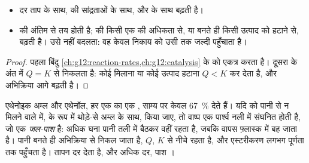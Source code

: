 \begin{proposition}[दर और लब्धि के उत्तोलक]\label{prop:g12:synthesis-strategy:levers}
\begin{itemize}
  \item दर ताप के साथ,  की सांद्रताओं के साथ,
        और  के साथ बढ़ती है।
  \item {} की अंतिम   से
        तय होती है;  की  किसी एक  की
        अधिकता से, या बनते ही किसी उत्पाद को हटाने से, बढ़ती है।
         उसे नहीं बदलता: वह केवल निकाय को उसी  तक
        जल्दी पहुँचाता है।
\end{itemize}
\end{proposition}

\begin{proof}
पहला बिंदु \cref{ch:g12:reaction-rates,ch:g12:catalysis} के 
को एकत्र करता है। दूसरा  के अंत में
$Q = K$ से निकलता है: कोई  मिलाना या कोई उत्पाद हटाना
$Q < K$ कर देता है, और अभिक्रिया आगे बढ़ती है।
\end{proof}

\begin{example}[जल-पाश के साथ एस्टरीकरण]\label{ex:g12:synthesis-strategy:trap}
एथेनोइक अम्ल और एथेनॉल, हर एक का एक , साम्य पर केवल
\qty{67}{\percent}  देते हैं। यदि  को पानी से न मिलने वाले  में,
 के रूप में थोड़े-से अम्ल के साथ,  किया जाए,
तो वाष्प एक पार्श्व नली में संघनित होती है, जो एक \emph{जल-पाश} है:
अधिक घना पानी तली में बैठकर वहीं रहता है, जबकि
 वापस फ़्लास्क में बह जाता है। पानी बनते ही अभिक्रिया से
निकल जाता है, $Q$, $K$ से नीचे रहता है, और एस्टरीकरण लगभग
पूर्णता तक पहुँचता है। तापन दर देता है,  और अधिक दर, पाश
।
\end{example}

